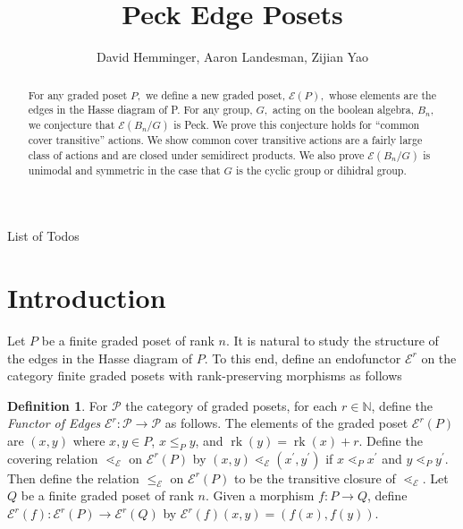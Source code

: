 \documentclass[10 pt]{amsart}
\title{Peck Edge Posets}
\author{David Hemminger, Aaron Landesman, Zijian Yao}
\makeatletter
\theoremstyle{plain}
\theoremstyle{definition}
\newtheorem{defn}[thm]{Definition}
\theoremstyle{remark}
\numberwithin{equation}{section}
\newcommand\BN{{\mathbb N}}
\newcommand\rk{\operatorname{rk}}
\def\listtodoname{List of Todos}
\def\listoftodos{\@starttoc{tdo}\listtodoname}
\makeatother
\begin{document}
\begin{abstract}
For any graded poset $P,$ we define a new graded poset, $\mathcal E(P),$ whose elements are the edges in the Hasse diagram of P. For any group, $G,$ acting on the boolean algebra, $B_n,$ we conjecture that $\mathcal E(B_n/G)$ is Peck. We prove this conjecture holds for ``common cover transitive'' actions. We show common cover transitive actions are a fairly large class of actions and are closed under semidirect products. We also prove $\mathcal E(B_n/G)$ is unimodal and symmetric in the case that $G$ is the cyclic group or dihidral group.
\end{abstract}

\maketitle

\tableofcontents
\newpage

\listoftodos
\newpage


\section{Introduction}\label{sec:introduction}

Let $P$ be a finite graded poset of rank $n$.  It is natural to study the structure of the edges in the Hasse diagram of $P$.  To this end, define an endofunctor $\mathcal E^r$ on the category finite graded posets with rank-preserving morphisms as follows

\begin{defn}
\label{defn:functor_of_edges}
For $\mathcal P$ the category of graded posets, for each $r \in \BN$, define the {\it Functor of Edges} $\mathcal E^r:\mathcal P \rightarrow \mathcal P$ as follows. The elements of the graded poset $\mathcal E^r(P)$ are $(x, y)$ where $x,y\in P$, $x\le_P y$, and $\rk(y) = \rk(x) + r$. Define the covering relation $\lessdot_{\mathcal E}$ on $\mathcal E^r(P)$ by $(x, y) \lessdot_{\mathcal E} (x^\prime, y^\prime)$ if $x\lessdot_P x^\prime$ and $y\lessdot_P y^\prime$.  Then define the relation $\le_{\mathcal E}$ on $\mathcal E^r(P)$ to be the transitive closure of $\lessdot_{\mathcal E}.$
Let $Q$ be a finite graded poset of rank $n$.  Given a morphism $f\colon P\rightarrow Q$, define $\mathcal E^r(f)\colon \mathcal E^r(P)\rightarrow \mathcal E^r(Q)$ by $\mathcal E^r(f)(x,y) = (f(x), f(y))$.
\end{defn}
\end{document}
